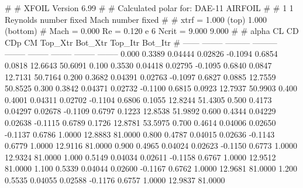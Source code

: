 #  
#       XFOIL         Version 6.99
#  
# Calculated polar for: DAE-11 AIRFOIL                                  
#  
# 1 1 Reynolds number fixed          Mach number fixed         
#  
# xtrf =   1.000 (top)        1.000 (bottom)  
# Mach =   0.000     Re =     0.120 e 6     Ncrit =   9.000  9.000
#  
#   alpha    CL        CD       CDp       CM     Top_Xtr  Bot_Xtr  Top_Itr  Bot_Itr
#  ------ -------- --------- --------- -------- -------- -------- -------- --------
   0.000   0.3389   0.04444   0.02826  -0.1094   0.6854   0.0818  12.6643  50.6091
   0.100   0.3530   0.04418   0.02795  -0.1095   0.6840   0.0847  12.7131  50.7164
   0.200   0.3682   0.04391   0.02763  -0.1097   0.6827   0.0885  12.7559  50.8525
   0.300   0.3842   0.04371   0.02732  -0.1100   0.6815   0.0923  12.7937  50.9903
   0.400   0.4001   0.04311   0.02702  -0.1104   0.6806   0.1055  12.8244  51.4305
   0.500   0.4173   0.04297   0.02678  -0.1109   0.6797   0.1223  12.8538  51.9892
   0.600   0.4344   0.04229   0.02638  -0.1115   0.6789   0.1726  12.8781  53.5975
   0.700   0.4614   0.04006   0.02650  -0.1137   0.6786   1.0000  12.8883  81.0000
   0.800   0.4787   0.04015   0.02636  -0.1143   0.6779   1.0000  12.9116  81.0000
   0.900   0.4965   0.04024   0.02623  -0.1150   0.6773   1.0000  12.9324  81.0000
   1.000   0.5149   0.04034   0.02611  -0.1158   0.6767   1.0000  12.9512  81.0000
   1.100   0.5339   0.04044   0.02600  -0.1167   0.6762   1.0000  12.9681  81.0000
   1.200   0.5535   0.04055   0.02588  -0.1176   0.6757   1.0000  12.9837  81.0000
